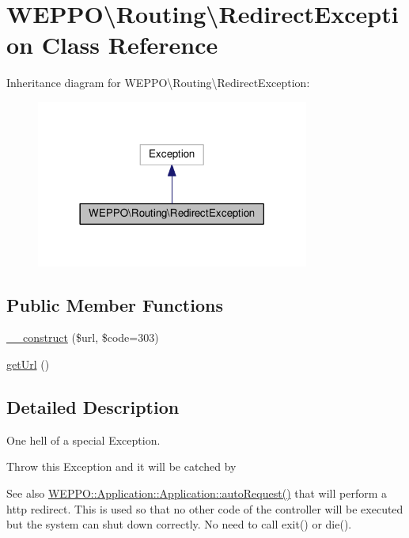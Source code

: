 \hypertarget{classWEPPO_1_1Routing_1_1RedirectException}{}\section{W\+E\+P\+PO\textbackslash{}Routing\textbackslash{}Redirect\+Exception Class Reference}
\label{classWEPPO_1_1Routing_1_1RedirectException}


Inheritance diagram for W\+E\+P\+PO\textbackslash{}Routing\textbackslash{}Redirect\+Exception\+:\nopagebreak
\begin{figure}[H]
\begin{center}
\leavevmode
\includegraphics[width=254pt]{classWEPPO_1_1Routing_1_1RedirectException__inherit__graph}
\end{center}
\end{figure}
\subsection*{Public Member Functions}
\begin{DoxyCompactItemize}
\item 
\hyperlink{classWEPPO_1_1Routing_1_1RedirectException_a6069a99cce92719f8787f50c613bbee9}{\+\_\+\+\_\+construct} (\$url, \$code=303)
\item 
\hyperlink{classWEPPO_1_1Routing_1_1RedirectException_a66b851c34043c6626c97f4314e57ca2b}{get\+Url} ()
\end{DoxyCompactItemize}


\subsection{Detailed Description}
One hell of a special Exception.

Throw this Exception and it will be catched by \begin{DoxySeeAlso}{See also}
\hyperlink{classWEPPO_1_1Application_1_1Application_a1a0c0171a086ce9a74fdb58ab891a488}{W\+E\+P\+P\+O\+::\+Application\+::\+Application\+::auto\+Request()} that will perform a http redirect. This is used so that no other code of the controller will be executed but the system can shut down correctly. No need to call exit() or die(). 
\end{DoxySeeAlso}


